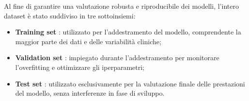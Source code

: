 Al fine di garantire una valutazione robusta e riproducibile dei modelli, l'intero dataset è stato suddiviso in tre sottoinsiemi:
\begin{itemize}
\item \textbf{Training set} : utilizzato per l'addestramento del modello, comprendente la maggior parte dei dati e delle variabilità cliniche;
\item \textbf{Validation set} : impiegato durante l’addestramento per monitorare l’overfitting e ottimizzare gli iperparametri;
\item \textbf{Test set} : utilizzato esclusivamente per la valutazione finale delle prestazioni del modello, senza interferenze in fase di sviluppo.
\end{itemize}



